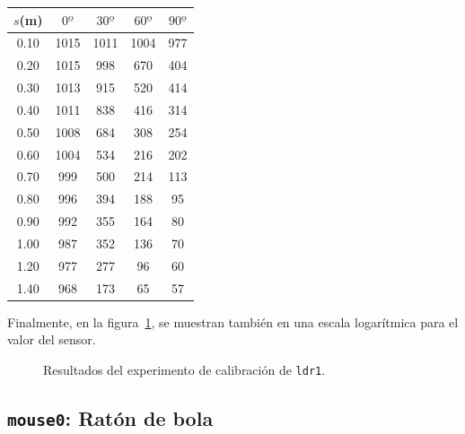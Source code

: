 \documentclass[10pt,a4paper,hidelinks,twocolumn]{article}
\begin{document}
\begin{center}
\begin{tabular}{ | c | c | c | c | c | }
\hline
$s$(m) & $0º$ & $30º$ & $60º$ & $90º$ \\ \hline
0.10 & 1015 & 1011 & 1004 & 977 \\ \hline
0.20 & 1015 & 998 & 670 & 404 \\ \hline
0.30 & 1013 & 915 & 520 & 414 \\ \hline
0.40 & 1011 & 838 & 416 & 314 \\ \hline
0.50 & 1008 & 684 & 308 & 254 \\ \hline
0.60 & 1004 & 534 & 216 & 202 \\ \hline
0.70 & 999 & 500 & 214 & 113 \\ \hline
0.80 & 996 & 394 & 188 & 95 \\ \hline
0.90 & 992 & 355 & 164 & 80 \\ \hline
1.00 & 987 & 352 & 136 & 70 \\ \hline
1.20 & 977 & 277 & 96 & 60 \\ \hline
1.40 & 968 & 173 & 65 & 57 \\ \hline
\end{tabular}
\end{center}

Finalmente, en la figura~\ref{fig:ldr1}, se muestran también en una escala 
logarítmica para el valor del sensor.

\begin{figure}[h]
\centering
{}
\caption{Resultados del experimento de calibración de 
\texttt{ldr1}.\label{fig:ldr1}}
\end{figure}
\subsection{\texttt{mouse0}: Ratón de bola}
\end{document}
